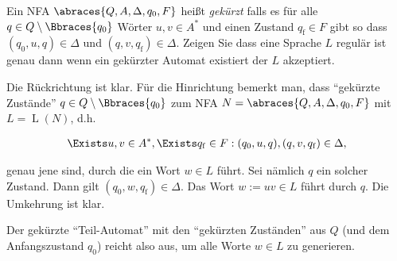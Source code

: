 
\begin{exercise}

Ein NFA $\abraces{Q, A, \Delta, q_0, F}$ heißt \textit{gekürzt} falls es für alle $q \in Q \setminus \Bbraces{q_0}$ Wörter $u, v \in A^\ast$ und einen Zustand $q_\mathrm{f} \in F$ gibt so dass $(q_0, u, q) \in \Delta$ und $(q, v, q_\mathrm{f}) \in \Delta$.
Zeigen Sie dass eine Sprache $L$ regulär ist genau dann wenn ein gekürzter Automat existiert der $L$ akzeptiert.

\end{exercise}


\begin{solution}

Die Rückrichtung ist klar.
Für die Hinrichtung bemerkt man, dass \enquote{gekürzte Zustände} $q \in Q \setminus \Bbraces{q_0}$ zum NFA $N = \abraces{Q, A, \Delta, q_0, F}$ mit $L = \operatorname L(N)$, d.h.

\begin{align*}
    \Exists u, v \in A^\ast, \Exists q_\mathrm{f} \in F:
        (q_0, u, q), (q, v, q_\mathrm{f}) \in \Delta,
\end{align*}

genau jene sind, durch die ein Wort $w \in L$ führt.
Sei nämlich $q$ ein solcher Zustand.
Dann gilt $(q_0, w, q_\mathrm{f}) \in \Delta$.
Das Wort $w := uv \in L$ führt durch $q$.
Die Umkehrung ist klar.

Der gekürzte \enquote{Teil-Automat} mit den \enquote{gekürzten Zuständen} aus $Q$ (und dem Anfangszustand $q_0$) reicht also aus, um alle Worte $w \in L$ zu generieren.

\end{solution}

